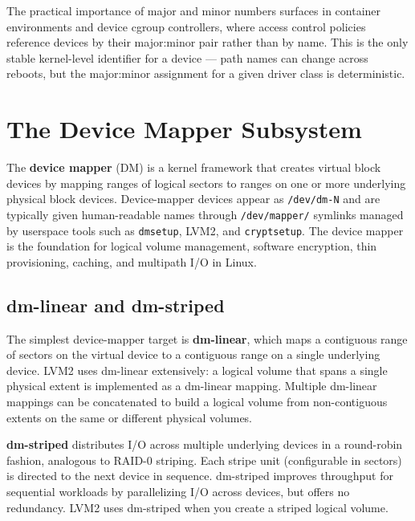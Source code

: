 The practical importance of major and minor numbers surfaces in container environments and device cgroup controllers, where access control policies reference devices by their major:minor pair rather than by name. This is the only stable kernel-level identifier for a device --- path names can change across reboots, but the major:minor assignment for a given driver class is deterministic.

\section{The Device Mapper Subsystem}
\label{sec:device-mapper}

The \textbf{device mapper} (DM) is a kernel framework that creates virtual block devices by mapping ranges of logical sectors to ranges on one or more underlying physical block devices. Device-mapper devices appear as \texttt{/dev/dm-N} and are typically given human-readable names through \texttt{/dev/mapper/} symlinks managed by userspace tools such as \texttt{dmsetup}, LVM2, and \texttt{cryptsetup}. The device mapper is the foundation for logical volume management, software encryption, thin provisioning, caching, and multipath I/O in Linux.

\subsection{dm-linear and dm-striped}

The simplest device-mapper target is \textbf{dm-linear}, which maps a contiguous range of sectors on the virtual device to a contiguous range on a single underlying device. LVM2 uses dm-linear extensively: a logical volume that spans a single physical extent is implemented as a dm-linear mapping. Multiple dm-linear mappings can be concatenated to build a logical volume from non-contiguous extents on the same or different physical volumes.

\textbf{dm-striped} distributes I/O across multiple underlying devices in a round-robin fashion, analogous to RAID-0 striping. Each stripe unit (configurable in sectors) is directed to the next device in sequence. dm-striped improves throughput for sequential workloads by parallelizing I/O across devices, but offers no redundancy. LVM2 uses dm-striped when you create a striped logical volume.

